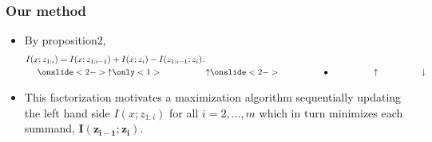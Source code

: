 \documentclass[10pt,mathserif]{beamer}
\begin{document}
\begin{frame}
\frametitle{Our method}
\begin{itemize}\itemsep=20pt
\item By proposition2,
\begin{align}
&I(x;z_{1:i}) = I(x;z_{1:i-1}) + I(x;z_{i}) - I(z_{1:i-1};z_{i}).\nonumber\\
&~~~~\onslide<2->{\uparrow} \only<1>{\qquad\qquad\quad\uparrow} \onslide<2->{\qquad\qquad\quad\bullet\quad\qquad\qquad\uparrow\qquad\qquad\quad\downarrow}\nonumber
\end{align}
\item This factorization motivates a maximization algorithm sequentially updating the left hand side $I(x; z_{1:i})$ for all $i=2,\ldots,m$ which in turn minimizes each summand, $\mathbf{I(z_{i-1};z_i)}$.
\end{itemize}
\end{frame}
\end{document}
